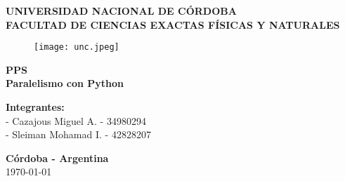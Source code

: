 \begin{titlepage}
  \begin{center}
    \vspace*{0.2cm}
    \Huge\textbf {UNIVERSIDAD NACIONAL DE C\'ORDOBA}\\
    \vspace*{0.3cm}
    \Large\textbf {FACULTAD DE CIENCIAS EXACTAS F\'ISICAS Y NATURALES}\\
    \vspace*{0.15cm}
    \begin{figure}[htb]
      \begin{center}
        \texttt{[image: unc.jpeg]}
      \end{center}
    \end{figure}
    \Large\textbf {PPS}\\
    \vspace*{0.3cm}
    \large\textbf {Paralelismo con Python}\\
    \vspace*{2cm}
  \end{center}
  \begin{flushleft}
    \large\textbf {Integrantes:}\\
    \hspace{3cm}- Cazajous Miguel A. - 34980294\\
    \hspace{3cm}- Sleiman Mohamad I. - 42828207\\
  \end{flushleft}
  \begin{center}
    \begin{large}
      \vspace*{0.4cm}
      \small\textbf {C\'ordoba - Argentina}\\
      \small\today
    \end{large}
  \end{center}
\end{titlepage}
